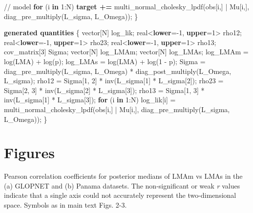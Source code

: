 \documentclass[
  12pt,
  letterpaper,
  DIV=11,
  numbers=noendperiod]{scrartcl}
\newenvironment{Shaded}{\begin{snugshade}}{\end{snugshade}}
\newcommand{\CommentTok}[1]{\textcolor[rgb]{0.37,0.37,0.37}{#1}}
\newcommand{\ControlFlowTok}[1]{\textcolor[rgb]{0.00,0.23,0.31}{\textbf{#1}}}
\newcommand{\DataTypeTok}[1]{\textcolor[rgb]{0.68,0.00,0.00}{#1}}
\newcommand{\DecValTok}[1]{\textcolor[rgb]{0.68,0.00,0.00}{#1}}
\newcommand{\KeywordTok}[1]{\textcolor[rgb]{0.00,0.23,0.31}{\textbf{#1}}}
\newcommand{\NormalTok}[1]{\textcolor[rgb]{0.00,0.23,0.31}{#1}}
\numberwithin{equation}{section}
\begin{document}
\begin{Shaded}
\begin{Highlighting}[]
  \CommentTok{// model}
  \ControlFlowTok{for}\NormalTok{ (i }\ControlFlowTok{in} \DecValTok{1}\NormalTok{:N)}
     \KeywordTok{target +=}\NormalTok{ multi\_normal\_cholesky\_lpdf(obs[i,] | Mu[i,], diag\_pre\_multiply(L\_sigma, L\_Omega));}
\NormalTok{\}}

\KeywordTok{generated quantities}\NormalTok{ \{}
  \DataTypeTok{vector}\NormalTok{[N] log\_lik;}
  \DataTypeTok{real}\NormalTok{\textless{}}\KeywordTok{lower}\NormalTok{={-}}\DecValTok{1}\NormalTok{, }\KeywordTok{upper}\NormalTok{=}\DecValTok{1}\NormalTok{\textgreater{} rho12;}
  \DataTypeTok{real}\NormalTok{\textless{}}\KeywordTok{lower}\NormalTok{={-}}\DecValTok{1}\NormalTok{, }\KeywordTok{upper}\NormalTok{=}\DecValTok{1}\NormalTok{\textgreater{} rho23;}
  \DataTypeTok{real}\NormalTok{\textless{}}\KeywordTok{lower}\NormalTok{={-}}\DecValTok{1}\NormalTok{, }\KeywordTok{upper}\NormalTok{=}\DecValTok{1}\NormalTok{\textgreater{} rho13;}
  \DataTypeTok{cov\_matrix}\NormalTok{[}\DecValTok{3}\NormalTok{] Sigma;}
  \DataTypeTok{vector}\NormalTok{[N] log\_LMAm;}
  \DataTypeTok{vector}\NormalTok{[N] log\_LMAs;}
\NormalTok{  log\_LMAm = log(LMA) + log(p);}
\NormalTok{  log\_LMAs = log(LMA) + log(}\DecValTok{1}\NormalTok{ {-} p);}
\NormalTok{  Sigma = diag\_pre\_multiply(L\_sigma, L\_Omega)}
\NormalTok{     * diag\_post\_multiply(L\_Omega\textquotesingle{}, L\_sigma);}
\NormalTok{  rho12 = Sigma[}\DecValTok{1}\NormalTok{, }\DecValTok{2}\NormalTok{] * inv(L\_sigma[}\DecValTok{1}\NormalTok{] * L\_sigma[}\DecValTok{2}\NormalTok{]);}
\NormalTok{  rho23 = Sigma[}\DecValTok{2}\NormalTok{, }\DecValTok{3}\NormalTok{] * inv(L\_sigma[}\DecValTok{2}\NormalTok{] * L\_sigma[}\DecValTok{3}\NormalTok{]);}
\NormalTok{  rho13 = Sigma[}\DecValTok{1}\NormalTok{, }\DecValTok{3}\NormalTok{] * inv(L\_sigma[}\DecValTok{1}\NormalTok{] * L\_sigma[}\DecValTok{3}\NormalTok{]);}
  \ControlFlowTok{for}\NormalTok{ (i }\ControlFlowTok{in} \DecValTok{1}\NormalTok{:N)}
\NormalTok{   log\_lik[i] = multi\_normal\_cholesky\_lpdf(obs[i,] | Mu[i,], diag\_pre\_multiply(L\_sigma, L\_Omega));}
\NormalTok{ \}}
\end{Highlighting}
\end{Shaded}

\newpage

\section*{Figures}

\begin{suppfig}


\caption{\label{suppfig-LMAm_LMAs}Pearson correlation coefficients for
posterior medians of LMAm vs LMAs in the (a) GLOPNET and (b) Panama
datasets. The non-significant or weak \emph{r} values indicate that a
single axis could not accurately represent the two-dimensional space.
Symbols as in main text Figs. 2-3.}

\end{suppfig}%
\end{document}
